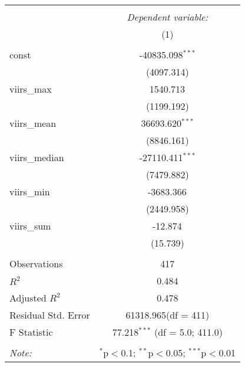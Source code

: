 \begin{table}[!htbp] \centering
\begin{tabular}{@{\extracolsep{5pt}}lc}
\\[-1.8ex]\hline
\hline \\[-1.8ex]
& \multicolumn{1}{c}{\textit{Dependent variable:}} \
\cr \cline{1-2}
\\[-1.8ex] & (1) \\
\hline \\[-1.8ex]
 const & -40835.098$^{***}$ \\
  & (4097.314) \\
 viirs_max & 1540.713$^{}$ \\
  & (1199.192) \\
 viirs_mean & 36693.620$^{***}$ \\
  & (8846.161) \\
 viirs_median & -27110.411$^{***}$ \\
  & (7479.882) \\
 viirs_min & -3683.366$^{}$ \\
  & (2449.958) \\
 viirs_sum & -12.874$^{}$ \\
  & (15.739) \\
\hline \\[-1.8ex]
 Observations & 417 \\
 $R^2$ & 0.484 \\
 Adjusted $R^2$ & 0.478 \\
 Residual Std. Error & 61318.965(df = 411)  \\
 F Statistic & 77.218$^{***}$ (df = 5.0; 411.0) \\
\hline
\hline \\[-1.8ex]
\textit{Note:} & \multicolumn{1}{r}{$^{*}$p$<$0.1; $^{**}$p$<$0.05; $^{***}$p$<$0.01} \\
\end{tabular}
\end{table}